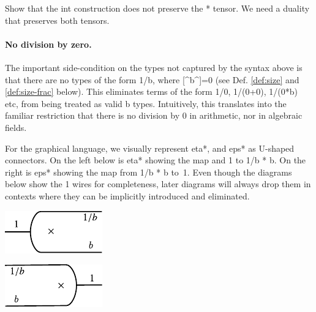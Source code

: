 \documentclass[preprint]{sigplanconf}
\begin{document}


Show that the int construction does not preserve the {{*}} tensor. We
need a duality that preserves both tensors.

\paragraph*{No division by zero.} 
The important side-condition on the types not captured by the syntax
above is that there are no types of the form {{1/b}}, where
{{[^b^]=0}} (see Def. \ref{def:size} and \ref{def:size-frac}
below). This eliminates terms of the form {{1/0}}, {{1/(0+0)}},
{{1/(0*b)}} etc, from being treated as valid {{b}} types. Intuitively,
this translates into the familiar restriction that there is no
division by 0 in arithmetic, nor in algebraic fields.

\begin{multicols}{2}  

\end{multicols}

For the graphical language, we visually represent {{eta*}}, and
{{eps*}} as U-shaped connectors. On the left below is {{eta*}} showing
the map and {{1}} to {{1/b * b}}.  On the right is {{eps*}} showing
the map from {{1/b * b}} to~1. Even though the diagrams below show the
{{1}} wires for completeness, later diagrams will always drop them in
contexts where they can be implicitly introduced and eliminated.
\begin{multicols}{2}
\begin{center}
  \includegraphics{diagrams/eta_times.pdf}
\end{center}
  
\begin{center}
  \includegraphics{diagrams/eps_times.pdf}
\end{center}
\end{multicols}
\end{document}
